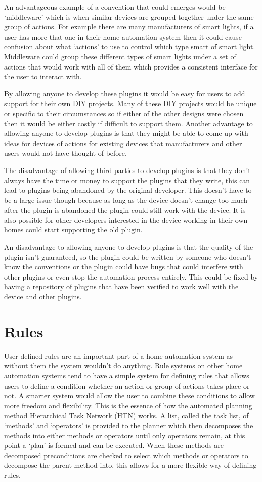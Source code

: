 An advantageous example of a convention that could emerges would be `middleware'
which is when similar devices are grouped together under the same group of
actions. For example there are many manufacturers of smart lights, if a user has
more that one in their home automation system then it could cause confusion
about what `actions' to use to control which type smart of smart light.
Middleware could group these different types of smart lights under a set of
actions that would work with all of them which provides a consistent interface
for the user to interact with.

By allowing anyone to develop these plugins it would be easy for users to add
support for their own DIY projects. Many of these DIY projects would be unique
or specific to their circumstances so if either of the other designs were chosen
then it would be either costly if difficult to support them. Another advantage
to allowing anyone to develop plugins is that they might be able to come up with
ideas for devices of actions for existing devices that manufacturers and other
users would not have thought of before.

The disadvantage of allowing third parties to develop plugins is that they don't
always have the time or money to support the plugins that they write, this can
lead to plugins being abandoned by the original developer. This doesn't have to
be a large issue though because as long as the device doesn't change too much
after the plugin is abandoned the plugin could still work with the device. It is
also possible for other developers interested in the device working in their own
homes could start supporting the old plugin.

An disadvantage to allowing anyone to develop plugins is that the quality of the
plugin isn't guaranteed, so the plugin could be written by someone who doesn't
know the conventions or the plugin could have bugs that could interfere with
other plugins or even stop the automation process entirely. This could be fixed
by having a repository of plugins that have been verified to work well with the
device and other plugins.

\section{Rules}
User defined rules are an important part of a home automation system as without
them the system wouldn't do anything. Rule systems on other home automation
systems tend to have a simple system for defining rules that allows users to
define a condition whether an action or group of actions takes place or not. A
smarter system would allow the user to combine these conditions to allow more
freedom and flexibility. This is the essence of how the automated planning
method Hierarchical Task Network (HTN) works. A list, called the task list, of
`methods' and `operators' is provided to the planner which then decomposes the
methods into either methods or operators until only operators remain, at this
point a `plan' is formed and can be executed. When these methods are decomposed
preconditions are checked to select which methods or operators to decompose the
parent method into, this allows for a more flexible way of defining rules.

